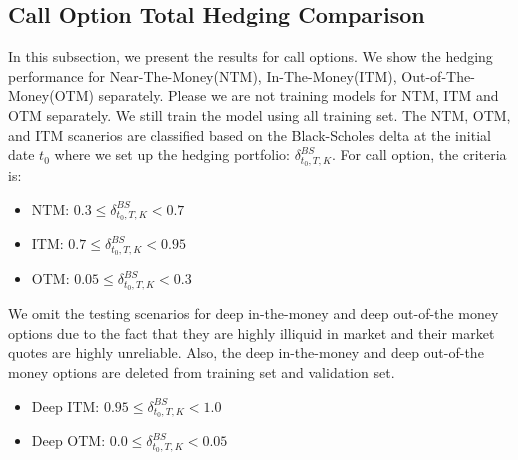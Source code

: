 \documentclass[letterpaper,12pt,titlepage,oneside,final]{book}
\numberwithin{equation}{section}
\theoremstyle{definition}
\begin{document}
 
\subsection{Call Option Total Hedging Comparison}
In this subsection, we present the results for call options. We show the hedging performance for Near-The-Money(NTM), In-The-Money(ITM), Out-of-The-Money(OTM) separately. Please we are not training  models for NTM, ITM and OTM separately. We still train the model using all training set. The NTM, OTM, and ITM scanerios are classified based on the Black-Scholes delta at the initial date $t_0$ where we set up the hedging portfolio: $\delta^{BS}_{t_0,T,K}$. For call option, the criteria is:
\begin{itemize}
	\item  NTM: $0.3 \leq \delta^{BS}_{t_0,T,K} <0.7$
	\item  ITM: $0.7 \leq \delta^{BS}_{t_0,T,K} <0.95$
	\item  OTM:  $0.05 \leq \delta^{BS}_{t_0,T,K} <0.3$
\end{itemize}
We omit the testing scenarios for deep in-the-money and deep out-of-the money options due to the fact that they are highly illiquid in market and their market quotes are highly unreliable. Also, the deep in-the-money and deep out-of-the money options are deleted from training set and validation set.
\begin{itemize}
	\item  Deep ITM: $0.95 \leq \delta^{BS}_{t_0,T,K} <1.0$
	\item  Deep OTM:  $0.0 \leq \delta^{BS}_{t_0,T,K} <0.05$
\end{itemize}
\end{document}
